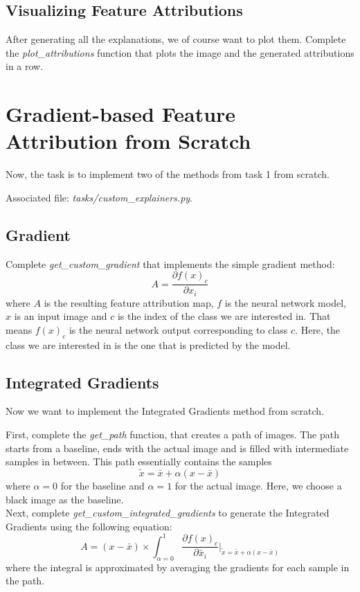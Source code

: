 \documentclass[a4paper]{article}
\begin{document}
\subsection{Visualizing Feature Attributions}
After generating all the explanations, we of course want to plot them.
Complete the \textit{plot\_attributions} function that plots the image and the generated attributions in a row.


\section{Gradient-based Feature Attribution from Scratch}
Now, the task is to implement two of the methods from task 1 from scratch.

\noindent Associated file: \textit{tasks/custom\_explainers.py}.

\subsection{Gradient}
Complete \textit{get\_custom\_gradient} that implements the simple gradient method:
\begin{equation}
    A = \frac{\partial f(x)_c}{\partial x_i}
\end{equation}
where $A$ is the resulting feature attribution map, $f$ is the neural network model, $x$ is an input image and $c$ is the index of the class we are interested in.
That means $f(x)_c$ is the neural network output corresponding to class $c$. Here, the class we are interested in is the one that is predicted by the model.


\subsection{Integrated Gradients}
Now we want to implement the Integrated Gradients method from scratch.

First, complete the \textit{get\_path} function, that creates a path of images.
The path starts from a baseline, ends with the actual image and is filled with intermediate samples in between.
This path essentially contains the samples
\begin{equation}
    \tilde{x} = \bar{x} + \alpha(x - \bar{x})
\end{equation}
where $\alpha=0$ for the baseline and $\alpha=1$ for the actual image.
Here, we choose a black image as the baseline.\\

Next, complete \textit{get\_custom\_integrated\_gradients} to generate the Integrated Gradients using the following equation:
\begin{equation}
    A = (x - \bar{x}) \times \int_{\alpha=0}^{1} \frac{\partial f(x)_c}{\partial \tilde{x_i}}\Bigg\rvert_{\tilde{x} = \bar{x} + \alpha(x - \bar{x})}
\end{equation}
where the integral is approximated by averaging the gradients for each sample in the path.
\end{document}
